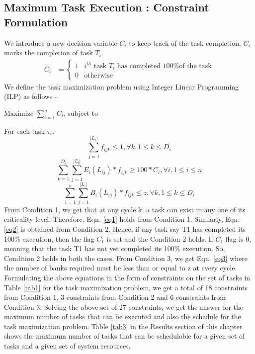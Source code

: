 \subsection{Maximum Task Execution : Constraint Formulation}
We introduce a new decision variable $C_{i}$ to keep track of the task completion. $C_i$ marks the completion of task $T_i$.
\begin{align*}
 C_{i} &=
 \begin{cases}
  1	& \text{$i^{th}$ task $T_{i}$ has completed 100\% of the task} \\
  0	& \text{otherwise}
 \end{cases}
\end{align*}
\newline
We define the task maximization problem using Integer Linear Programming (ILP) as follows -
\newline
\begin{center}
 Maximize $\sum_{i = 1}^{n} C_{i}$, subject to
 \end{center}
For each task $\tau_i$,
 \begin{equation}\label{eq1}
\sum_{j = 1}^{|L_{i}|} f_{ijk} \leq 1, \forall k, 1 \leq k \leq D_{i}
\end{equation}
\newline
\begin{equation}\label{eq2}
\sum_{k = 1}^{D_{i}} \sum_{j = 1}^{|L_{i}|} E_{i}(L_{ij}) * f_{ijk} \geq 100 * C_i, \forall i, 1 \leq i \leq n 
\end{equation}
\newline
\begin{equation}\label{eq3}
\sum_{i = 1}^{n} \sum_{j = 1}^{|L_{i}|} B_{i}(L_{ij}) * f_{ijk} \leq z, \forall k,1 \leq k \leq D_i
\end{equation}
\newline
From Condition 1, we get that at any cycle k, a task can exist in any one of its criticality level. Therefore, Eqn. \ref{eq1}
holds from Condition 1. Similarly, Eqn. \ref{eq2} is obtained from Condition 2. Hence, if any task say T1 has completed 
its 100\% execution, then the flag $C_{1}$ is set and the Condition 2 holds. If $C_{1}$ flag is 0, meaning that the task T1 
has not yet completed its 100\% execution. So, Condition 2 holds in both the cases. From Condition 3, we get Eqn. \ref{eq3} 
where the number of banks required must be less than or equal to z at every cycle. 
Formulating the above equations in the form of constraints on the set of tasks in Table \ref{tab1} for the task maximization 
problem, we get a total of 18 constraints from Condition 1, 3 constraints from Condition 2 and 6 constraints from Condition 3.
Solving the above set of 27 constraints, we get the answer for the maximum number of tasks that can be executed and also 
the schedule for the task maximization problem. Table \ref{tab3} in the Results section of this chapter shows the maximum number of tasks that can be schedulable for a given set of tasks and a given set of 
system resources.


